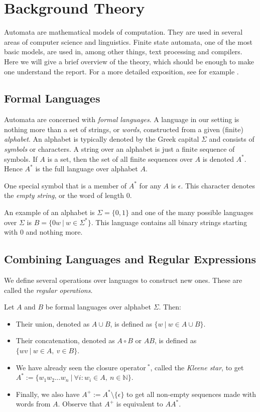 \section{Background Theory}
\label{theory}
Automata are mathematical models of computation. They are used in several areas of computer science and linguistics. Finite state automata, one of the most basic models, are used in, among other things, text processing and compilers. Here we will give a brief overview of the theory, which should be enough to make one understand the report. For a more detailed exposition, see for example \cite{sipser13}.


\subsection{Formal Languages}
Automata are concerned with \emph{formal languages}. A language in our setting is nothing more than a set of strings, or \emph{words}, constructed from a given (finite) \emph{alphabet}. An alphabet is typically denoted by the Greek capital $\Sigma$ and consists of \emph{symbols} or characters. A string over an alphabet is just a finite sequence of symbols. If $A$ is a set, then the set of all finite sequences over $A$ is denoted $A^*$. Hence $A^*$ is the full language over alphabet $A$. 

One special symbol that is a member of $A^*$ for any $A$ is $\epsilon$. This character denotes the \emph{empty string}, or the word of length 0.

An example of an alphabet is $\Sigma = \{0,1\}$ and one of the many possible languages over $\Sigma$ is $B = \{0w\ |\ w \in \Sigma^*\}$. This language contains all binary strings starting with 0 and nothing more.

\subsection{Combining Languages and Regular Expressions}
We define several operations over languages to construct new ones. These are called the \emph{regular operations}.

Let $A$ and $B$ be formal languages over alphabet $\Sigma$. Then:
\begin{itemize}
	\item Their union, denoted as $A\cup B$, is defined as $\{w\ |\ w\in A\cup B\}$. 
	\item Their concatenation, denoted as $A\circ B$ or $AB$, is defined as $\{wv\ |\ w\in A,\ v\in B\}$.
	\item We have already seen the closure operator$\ ^*$, called the \emph{Kleene star}, to get $A^*:=\{w_1w_2\dots w_n\ |\ \forall i: w_i\in A,\ n\in\mathbb{N}\}$.
	\item Finally, we also have $A^+:= A^*\setminus\{\epsilon\}$ to get all non-empty sequences made with words from $A$. Observe that $A^+$ is equivalent to $AA^*$.	
\end{itemize}

